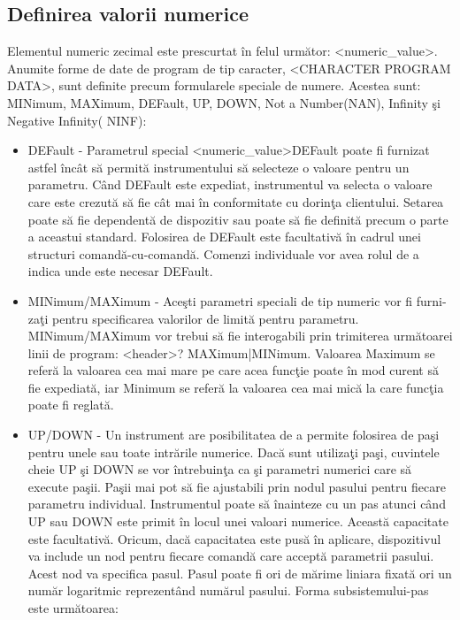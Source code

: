 \subsection{Definirea valorii numerice}
Elementul numeric zecimal este prescurtat \^{i}n felul urm\u{a}tor: \textless  numeric\_value\textgreater . Anumite forme de date de program de tip caracter, \textless CHARACTER PROGRAM DATA\textgreater , sunt definite precum formularele speciale de numere. Acestea sunt: MINimum, MAXimum, DEFault, UP, DOWN, Not a Number(NAN), Infinity \c{s}i Negative Infinity( NINF):

\begin{itemize}
	\item DEFault - Parametrul special \textless numeric\_value\textgreater DEFault poate fi furnizat astfel \^{i}nc\^{a}t s\u{a} permit\u{a} instrumentului s\u{a} selecteze o valoare pentru un parametru. C\^{a}nd DEFault este expediat, instrumentul va selecta o valoare care este crezut\u{a} s\u{a} fie c\^{a}t mai \^{i}n conformitate cu dorin\c{t}a clientului. Setarea poate s\u{a} fie dependent\u{a} de dispozitiv sau poate s\u{a} fie definit\u{a} precum o parte a aceastui standard. Folosirea de DEFault este facultativ\u{a} \^{i}n cadrul unei structuri comand\u{a}-cu-comand\u{a}. Comenzi individuale vor avea rolul de a indica unde este necesar DEFault.
	\item MINimum/MAXimum - Ace\c{s}ti parametri speciali de tip numeric vor fi furni-za\c{t}i pentru specificarea valorilor de limit\u{a} pentru parametru. MINimum/MAXimum vor trebui s\u{a} fie interogabili prin trimiterea urm\u{a}toarei linii de program: \textless header\textgreater? MAXimum|MINimum. Valoarea Maximum se refer\u{a} la valoarea cea mai mare pe care acea func\c{t}ie poate \^{i}n mod curent s\u{a} fie expediat\u{a}, iar Minimum se refer\u{a} la valoarea cea mai mic\u{a} la care func\c{t}ia poate fi reglat\u{a}.
	\item UP/DOWN - Un instrument are posibilitatea de a permite folosirea de pa\c{s}i pentru unele sau toate intr\u{a}rile numerice. Dac\u{a} sunt utiliza\c{t}i pa\c{s}i, cuvintele cheie UP \c{s}i DOWN se vor \^{i}ntrebuin\c{t}a ca \c{s}i parametri numerici care s\u{a} execute pa\c{s}ii. Pa\c{s}ii mai pot s\u{a} fie ajustabili prin nodul pasului pentru fiecare parametru individual. Instrumentul poate s\u{a} \^{i}nainteze cu un pas atunci c\^{a}nd  UP sau DOWN este primit \^{i}n locul unei valoari numerice. Aceast\u{a} capacitate este facultativ\u{a}. Oricum, dac\u{a} capacitatea este pus\u{a} \^{i}n aplicare, dispozitivul va include un nod pentru fiecare comand\u{a} care accept\u{a} parametrii pasului. Acest nod va specifica pasul. Pasul poate fi ori de m\u{a}rime liniara fixat\u{a} ori un num\u{a}r logaritmic reprezent\^{a}nd num\u{a}rul pasului. Forma subsistemului-pas este urm\u{a}toarea:
\end{itemize}

